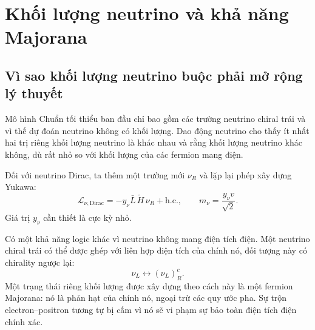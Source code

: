 \begin{classroomqa}
\end{classroomqa}

\section{Khối lượng neutrino và khả năng Majorana}

\subsection{Vì sao khối lượng neutrino buộc phải mở rộng lý thuyết}

Mô hình Chuẩn tối thiểu ban đầu chỉ bao gồm các trường neutrino chiral trái và vì thế dự đoán neutrino không có khối lượng. Dao động neutrino cho thấy ít nhất hai trị riêng khối lượng neutrino là khác nhau và rằng khối lượng neutrino khác không, dù rất nhỏ so với khối lượng của các fermion mang điện.

\begin{classroomqa}
\end{classroomqa}

Đối với neutrino Dirac, ta thêm một trường mới \(\nu_R\) và lặp lại phép xây dựng Yukawa:
\begin{equation}
  \mathcal L_{\nu,\mathrm{Dirac}}
  =-y_\nu\bar L\,\widetilde H\,\nu_R+\mathrm{h.c.},
  \qquad
  m_\nu=\frac{y_\nu v}{\sqrt2}.
  \label{eq:l09-dirac-neutrino}
\end{equation}
Giá trị \(y_\nu\) cần thiết là cực kỳ nhỏ.

Có một khả năng logic khác vì neutrino không mang điện tích điện. Một neutrino chiral trái có thể được ghép với liên hợp điện tích của chính nó, đối tượng này có chirality ngược lại:
\begin{equation}
  \nu_L\longleftrightarrow(\nu_L)^c_R .
  \label{eq:l09-majorana-mixing}
\end{equation}
Một trạng thái riêng khối lượng được xây dựng theo cách này là một fermion Majorana: nó là phản hạt của chính nó, ngoại trừ các quy ước pha. Sự trộn electron--positron tương tự bị cấm vì nó sẽ vi phạm sự bảo toàn điện tích điện chính xác.

